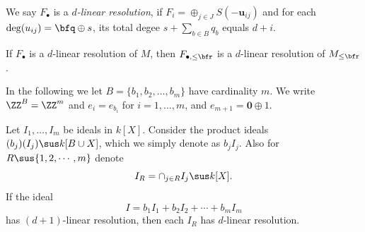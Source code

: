 We say $F_{\bullet}$ is a {\it $d$-linear resolution}, if
$F_i = \oplus_{j \in J} S(-{\mathbf u}_{ij})$ and for each
$\deg(u_{ij}) = \bfq \oplus s$, its total degee $s + \sum_{b \in B} q_b$
equals $d + i$.

\begin{coro} \label{cor:lin-Frlin}
  If $F_{\bullet}$ is a $d$-linear resolution of $M$, then
  $F_{\bullet, \leq \bfr}$ is a $d$-linear resolution of $M_{\leq \bfr}$.
\end{coro}

In the following we let $B = \{b_1, b_2, \ldots, b_m\}$ have
cardinality $m$. We write $\ZZ^B = \ZZ^m$ and $e_i = e_{b_i}$ for
$i = 1, \ldots, m$, and $e_{m+1} = {\mathbf 0} \oplus 1$.

\begin{prop} \label{pro:lin-ItoIR}
  Let $I_1, \ldots, I_m$ be ideals in $k[X]$.
Consider the product ideals $(b_j) (I_j) \sus k[B \cup X]$, which
we simply denote as $b_j I_j$. Also for $R \sus \{1,2, \cdots, m\}$
denote
\[ I_R = \cap_{j \in R} I_j  \sus k[X]. \]
If the ideal
\[ I = b_1 I_1 + b_2 I_2 + \cdots + b_m I_m \]
has $(d+1)$-linear resolution, then each $I_R$ has $d$-linear resolution.
\end{prop}

